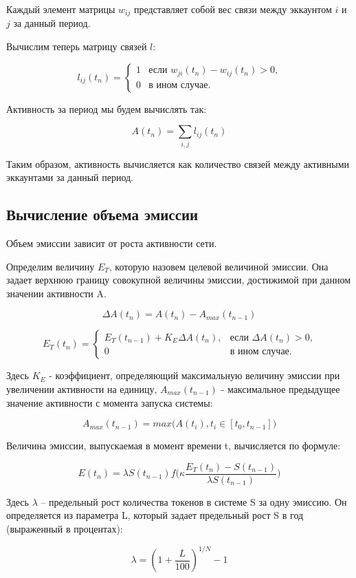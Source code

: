 \documentclass[a4paper,12pt]{article}
\begin{document}
Каждый элемент матрицы $w_{ij}$ представляет собой вес связи между эккаунтом $i$ и $j$ за данный период.

Вычислим теперь матрицу связей $l$:

$$
l_{ij}(t_n) = \begin{cases}
 1
 & \text{если $w_{ji}(t_n)-w_{ij}(t_n) > 0$,}\\
 0 & \text{в ином случае.}
\end{cases}
$$

Активность за период мы будем вычислять так:

$$
A(t_n) = \sum_{i,j} l_{ij}(t_n)
$$

Таким образом, активность вычисляется как количество связей между активными эккаунтами за данный период.

\subsection{Вычисление объема эмиссии}

Объем эмиссии зависит от роста активности сети.

Определим величину $E_T$, которую назовем целевой величиной эмиссии. Она задает верхнюю границу совокупной величины эмиссии, достижимой при данном значении активности A.

$$
\Delta A(t_n) = A(t_n) - A_{max}(t_{n-1})
$$

$$
E_T(t_n) = \begin{cases}
 E_T(t_{n-1}) + K_E \Delta A(t_n),
 & \text{если $\Delta A(t_n) > 0$,}\\
 0 & \text{в ином случае.}
\end{cases}
$$

Здесь $K_E$ - коэффициент, определяющий максимальную величину эмиссии при увеличении активности на единицу, $A_{max}(t_{n-1})$ - максимальное предыдущее значение активности с момента запуска системы:

$$
    A_{max}(t_{n-1}) = max \Big ( A(t_i), t_i \in [t_0, t_{n-1}] \Big )
$$

Величина эмиссии, выпускаемая в момент времени t, вычисляется по формуле:

$$
    E(t_n) = \lambda S(t_{n-1}) f \Big( \kappa \frac {E_T(t_n) - S(t_{n-1})}{\lambda S(t_{n-1})} \Big)
$$

Здесь $\lambda$ -- предельный рост количества токенов в системе S за одну эмиссию. Он определяется из параметра L, который задает предельный рост S в год (выраженный в процентах):

$$
    \lambda = (1 + \frac{L}{100})^{1/N}-1
$$
\end{document}
